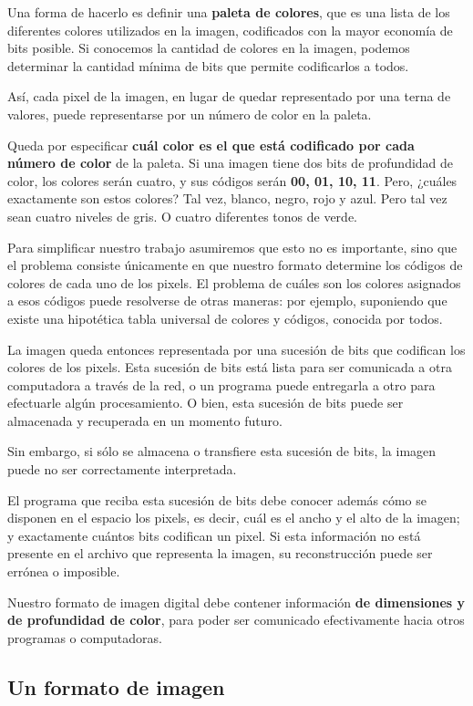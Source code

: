 \documentclass[spanish,A4,]{article}
\begin{document}
Una forma de hacerlo es definir una \textbf{paleta de colores}, que es
una lista de los diferentes colores utilizados en la imagen, codificados
con la mayor economía de bits posible. Si conocemos la cantidad de
colores en la imagen, podemos determinar la cantidad mínima de bits que
permite codificarlos a todos.

Así, cada pixel de la imagen, en lugar de quedar representado por una
terna de valores, puede representarse por un número de color en la
paleta.

Queda por especificar \textbf{cuál color es el que está codificado por
cada número de color} de la paleta. Si una imagen tiene dos bits de
profundidad de color, los colores serán cuatro, y sus códigos serán
\textbf{00, 01, 10, 11}. Pero, ¿cuáles exactamente son estos colores?
Tal vez, blanco, negro, rojo y azul. Pero tal vez sean cuatro niveles de
gris. O cuatro diferentes tonos de verde.

Para simplificar nuestro trabajo asumiremos que esto no es importante,
sino que el problema consiste únicamente en que nuestro formato
determine los códigos de colores de cada uno de los pixels. El problema
de cuáles son los colores asignados a esos códigos puede resolverse de
otras maneras: por ejemplo, suponiendo que existe una hipotética tabla
universal de colores y códigos, conocida por todos.

La imagen queda entonces representada por una sucesión de bits que
codifican los colores de los pixels. Esta sucesión de bits está lista
para ser comunicada a otra computadora a través de la red, o un programa
puede entregarla a otro para efectuarle algún procesamiento. O bien,
esta sucesión de bits puede ser almacenada y recuperada en un momento
futuro.

Sin embargo, si sólo se almacena o transfiere esta sucesión de bits, la
imagen puede no ser correctamente interpretada.

El programa que reciba esta sucesión de bits debe conocer además cómo se
disponen en el espacio los pixels, es decir, cuál es el ancho y el alto
de la imagen; y exactamente cuántos bits codifican un pixel. Si esta
información no está presente en el archivo que representa la imagen, su
reconstrucción puede ser errónea o imposible.

Nuestro formato de imagen digital debe contener información \textbf{de
dimensiones y de profundidad de color}, para poder ser comunicado
efectivamente hacia otros programas o computadoras.

\subsection{Un formato de imagen}\label{un-formato-de-imagen}
\end{document}
